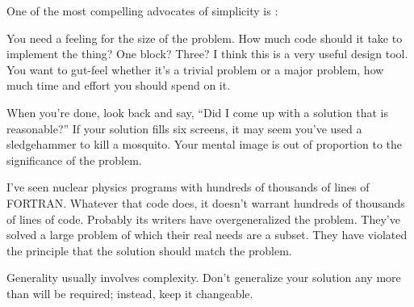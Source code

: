 \begin{interview}
One of the most compelling advocates of simplicity is
:

\begin{tfquot}
You need a feeling for the size of the problem. How much code should
it take to implement the thing? One block? Three? I think this is a
very useful design tool. You want to gut-feel whether it's a trivial
problem or a major problem, how much time and effort you should spend
on it.

When you're done, look back and say, ``Did I come up with a solution
that is reasonable?'' If your solution fills six screens, it may seem
you've used a sledgehammer to kill a mosquito. Your mental image is
out of proportion to the significance of the problem.

I've seen nuclear physics programs with hundreds of thousands of lines
of FORTRAN. Whatever that code does, it doesn't warrant hundreds of
thousands of lines of code. Probably its writers have overgeneralized
the problem. They've solved a large problem of which their real needs
are a subset. They have violated the principle that the solution
should match the problem.
\end{tfquot}
\end{interview}
\begin{tip}
Generality usually involves complexity. Don't generalize your solution any
more than will be required; instead, keep it changeable.
\end{tip}
